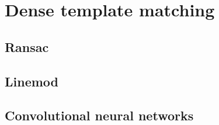 \chapter{Dense template matching}
\label{cha:template}

\section{Ransac}
\label{seq:ransac}


\section{Linemod}
\label{seq:linemod}


\section{Convolutional neural networks}
\label{seq:cnns}